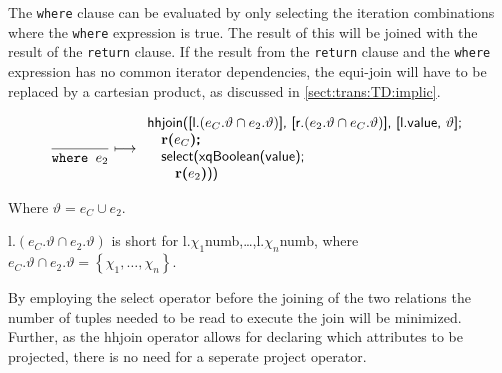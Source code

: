 The \texttt{where} clause can be evaluated by only selecting the iteration combinations where the \texttt{where}
expression is true. The result of this will be joined with the result of the \texttt{return} clause. If the result
from the \texttt{return} clause and the \texttt{where} expression has no common iterator dependencies, the
equi-join will have to be replaced by a cartesian product, as discussed in \ref{sect:trans:TD:implic}.

\begin{equation}
\frac{}{\mbox{\texttt{where }}e_2}\longmapsto
\begin{array}{l}
\mbox{\textsf{hhjoin([l.}}(e_{C}.\vartheta \cap e_2.\vartheta)\mbox{\textsf{], [r.}}(e_{2}.\vartheta \cap
e_{C}.\vartheta)\mbox{\textsf{], [l.value, }} \vartheta\mbox{\textsf{];}} \\ \quad
\mbox{\textbf{r(}}e_{C}\mbox{\textbf{)\textsf{;}}} \\ \quad
\mbox{\textsf{select(xqBoolean(value);}} \\ \quad \quad
\mbox{\textbf{r(}}e_{2}\mbox{\textbf{)}\textsf{))}}
\end{array}
\label{rule:trans:TD:where}
\end{equation}

Where $\vartheta = e_{C} \cup e_{2}$.

\textsf{l.}$(e_{C}.\vartheta \cap e_2.\vartheta)$ is short for
\textsf{l.}$\chi_1$\textsf{numb,\ldots,l.}$\chi_n$\textsf{numb}, where $e_{C}.\vartheta \cap e_2.\vartheta =
\left\{\chi_1,\ldots,\chi_n\right\}$.

By employing the \textsf{select} operator before the joining of the two relations the number of tuples needed to
be read to execute the join will be minimized. Further, as the \textsf{hhjoin} operator allows for declaring which
attributes to be projected, there is no need for a seperate \textsf{project} operator.

